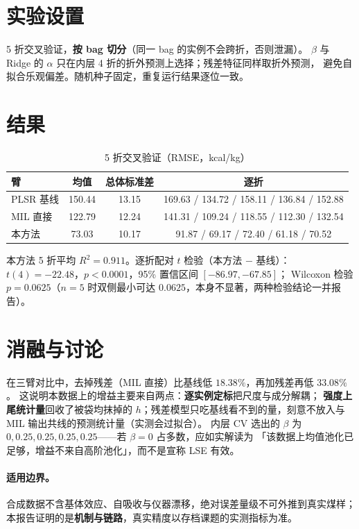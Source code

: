 \documentclass[11pt,a4paper,UTF8]{ctexart}
\begin{document}
\section{实验设置}
5 折交叉验证，\textbf{按 bag 切分}（同一 bag 的实例不会跨折，否则泄漏）。
$\beta$ 与 Ridge 的 $\alpha$ 只在内层 4 折的折外预测上选择；残差特征同样取折外预测，
避免自拟合乐观偏差。随机种子固定，重复运行结果逐位一致。

\section{结果}
\begin{table}[h]
\centering
\caption{5 折交叉验证（RMSE，kcal/kg）}
\begin{tabular}{lccc}
\toprule
臂 & 均值 & 总体标准差 & 逐折 \\
\midrule
PLSR 基线 & 150.44 & 13.15 & 169.63 / 134.72 / 158.11 / 136.84 / 152.88 \\
MIL 直接 & 122.79 & 12.24 & 141.31 / 109.24 / 118.55 / 112.30 / 132.54 \\
本方法 & 73.03 & 10.17 & 91.87 / 69.17 / 72.40 / 61.18 / 70.52 \\
\bottomrule
\end{tabular}
\end{table}

本方法 5 折平均 $R^2=0.911$。逐折配对 $t$ 检验（本方法 $-$ 基线）：
$t(4)=-22.48$，$p<0.0001$，95\% 置信区间 $[-86.97, -67.85]$；
Wilcoxon 检验 $p=0.0625$（$n=5$ 时双侧最小可达 $0.0625$，本身不显著，两种检验结论一并报告）。

\section{消融与讨论}
在三臂对比中，去掉残差（MIL 直接）比基线低 $18.38\%$，再加残差再低 $33.08\%$。
这说明本数据上的增益主要来自两点：\textbf{逐实例定标}把尺度与成分解耦；
\textbf{强度上尾统计量}回收了被袋均抹掉的 $h$；残差模型只吃基线看不到的量，刻意不放入与 MIL 输出共线的预测统计量（实测会过拟合）。
内层 CV 选出的 $\beta$ 为 $0, 0.25, 0.25, 0.25, 0.25$——若 $\beta=0$ 占多数，应如实解读为
「该数据上均值池化已足够，增益不来自高阶池化」，而不是宣称 LSE 有效。

\paragraph{适用边界。}合成数据不含基体效应、自吸收与仪器漂移，绝对误差量级不可外推到真实煤样；
本报告证明的是\textbf{机制与链路}，真实精度以存档课题的实测指标为准。
\end{document}
